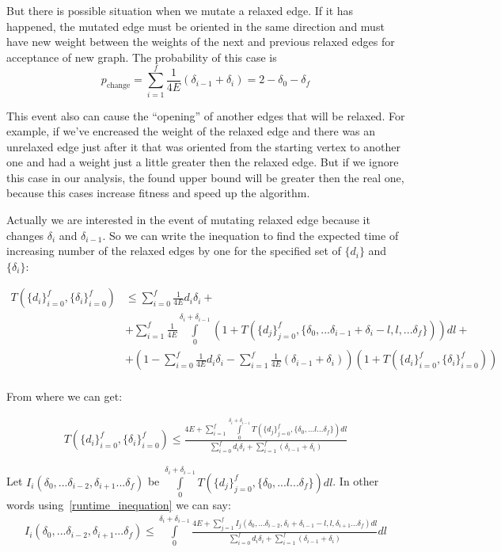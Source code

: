\documentclass[a4paper,10pt]{article}
\theoremstyle{definition}
\begin{document}
But there is possible situation when we mutate a relaxed edge. If it has happened, the mutated edge must be oriented in the same direction and must have new weight between the weights of the next and previous relaxed edges for acceptance of new graph. The probability of this case is
$$p_\text{change} = \sum_{i = 1}^f \frac{1}{4E} (\delta_{i - 1} + \delta_i) = 2 - \delta_0 - \delta_f$$

This event also can cause the ``opening'' of another edges that will be relaxed. For example, if we've encreased the weight of the relaxed edge and there was an unrelaxed edge just after it that was oriented from the starting vertex to another one and had a weight just a little greater then the relaxed edge. But if we ignore this case in our analysis, the found upper bound will be greater then the real one, because this cases increase fitness and speed up the algorithm.

Actually we are interested in the event of mutating relaxed edge because it changes $\delta_i$ and $\delta_{i - 1}$. So we can write the inequation to find the expected time of increasing number of the relaxed edges by one for the specified set of $\{d_i\}$ and $\{\delta_i\}$:

\begin{align*}
T(\{d_i\}_{i = 0}^f, \{\delta_i\}_{i = 0}^f) & \le \sum_{i = 0}^f \frac{1}{4E}d_i \delta_i + \\
& + \sum_{i = 1}^f \frac{1}{4E} \int\limits_{0}^{\delta_i + \delta_{i - 1}} (1 + T(\{d_j\}_{j = 0}^f, \{\delta_0, ... \delta_{i-1} + \delta_i - l, l, ...\delta_f\}) ) dl + \\
& + \left(1 - \sum_{i = 0}^f \frac{1}{4E}d_i \delta_i - \sum_{i = 1}^f \frac{1}{4E}(\delta_{i - 1} + \delta_i) \right)(1 + T(\{d_i\}_{i = 0}^f, \{\delta_i\}_{i = 0}^f)) \\
\end{align*}

From where we can get:

\begin{align}
 T(\{d_i\}_{i = 0}^f, \{\delta_i\}_{i = 0}^f) \le \frac{4E + \sum_{i = 1}^f\int\limits_{0}^{\delta_i + \delta_{i - 1}} T(\{d_j\}_{j = 0}^f, \{\delta_0, ... l ...\delta_f\})  dl}{\sum_{i = 0}^f d_i \delta_i + \sum_{i = 1}^f (\delta_{i - 1} + \delta_i)} \label{runtime_inequation}
\end{align}

Let $I_i(\delta_0, ... \delta_{i - 2}, \delta_{i + 1} ...\delta_f)$ be $\int\limits_{0}^{\delta_i + \delta_{i - 1}} T(\{d_j\}_{j = 0}^f, \{\delta_0, ... l ...\delta_f\})  dl$. In other words using~\ref{runtime_inequation} we can say:
\begin{align*}
I_i(\delta_0, ... \delta_{i - 2}, \delta_{i + 1} ...\delta_f) \le \int\limits_{0}^{\delta_i + \delta_{i - 1}} \frac{4E + \sum_{j = 1}^f I_j(\delta_0, ... \delta_{i - 2}, \delta_i + \delta_{i - 1} - l, l, \delta_{i + 1} ...\delta_f)  dl}{\sum_{i = 0}^f d_i \delta_i + \sum_{i = 1}^f (\delta_{i - 1} + \delta_i)} dl
\end{align*}
\end{document}
